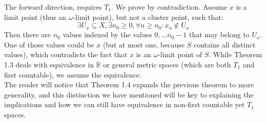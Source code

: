 \documentclass[10pt,letterpaper]{article} %
\begin{document}
The forward direction, requires $T_1$. We prove by contradiction. Assume $x$ is a limit point (thus an $\omega$-limit point), but not a cluster point, such that:
\begin{equation*}
\exists U_x \subseteq X, \exists n_0 \geqslant 0, \forall n \geqslant n_0: x_n \notin U_x
\end{equation*}
Then there are $n_0$ values indexed by the values $0,...n_0 - 1$ that may belong to $U_x$. One of those values could be $x$ (but at most one, because $S$ contains all distinct values), which contradicts the fact that $x$ is an $\omega$-limit point of $S$. While Theorem 1.3 deals with equivalence in $\mathbb{R}$ or general metric spaces (which are both $T_1$ and first countable), we assume the equivalence.\\

The reader will notice that Theorem 1.4 expands the previous theorem to more generality, and this distinction we have mentioned will be key to explaining the implications and how we can still have equivalence in non-first countable yet $T_1$ spaces.
\end{document}
